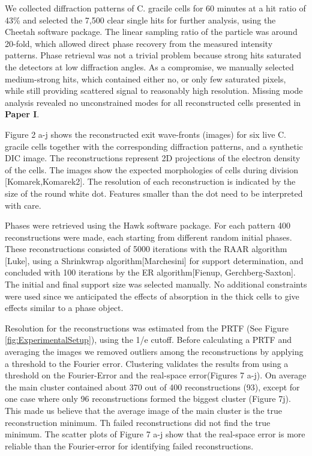 We collected diffraction patterns of C. gracile cells for 60 minutes at a hit ratio of 43\% and selected the 7,500 clear single hits for further analysis, using the Cheetah software package. The linear sampling ratio of the particle was around 20-fold, which allowed direct phase recovery from the measured intensity patterns. Phase retrieval was not a trivial problem because strong hits saturated the detectors at low diffraction angles. As a compromise, we manually selected medium-strong hits, which contained either no, or only few saturated pixels, while still providing scattered signal to reasonably high resolution. Missing mode analysis revealed no unconstrained modes for all reconstructed cells presented in \textbf{Paper I}. 

Figure 2 a-j shows the reconstructed exit wave-fronts (images) for six live C. gracile cells together with the corresponding diffraction patterns, and a synthetic DIC image. The reconstructions represent 2D projections of the electron density of the cells. The images show the expected morphologies of cells during division [Komarek,Komarek2]. The resolution of each  reconstruction is indicated by the size of the round white dot. Features smaller than the dot need to be interpreted with care.

Phases were retrieved using the Hawk software package. For each pattern 400 reconstructions were made, each starting from different random initial phases. These reconstructions consisted of 5000 iterations with the RAAR algorithm [Luke], using a Shrinkwrap algorithm[Marchesini] for support determination, and concluded with 100 iterations by the ER algorithm[Fienup, Gerchberg-Saxton]. The initial and final support size was selected manually. No additional constraints were used since we anticipated the effects of absorption in the thick cells to give effects similar to a phase object. 

Resolution for the reconstructions was estimated from the PRTF (See Figure \ref{fig:ExperimentalSetup}), using the 1/e cutoff. Before calculating a PRTF and averaging the images we removed outliers among the reconstructions by applying a threshold to the Fourier error. Clustering validates the results from using a threshold on the Fourier-Error and the real-space error(Figures 7 a-j). On average the main cluster contained about 370 out of 400 reconstructions (93), except for one case where only 96 reconstructions formed the biggest cluster (Figure 7j). This made us believe that the average image of the main cluster is the true reconstruction minimum. Th failed reconstructions did not find the true minimum.
The scatter plots of Figure 7 a-j show that the real-space error is more reliable than the Fourier-error for identifying failed reconstructions.

